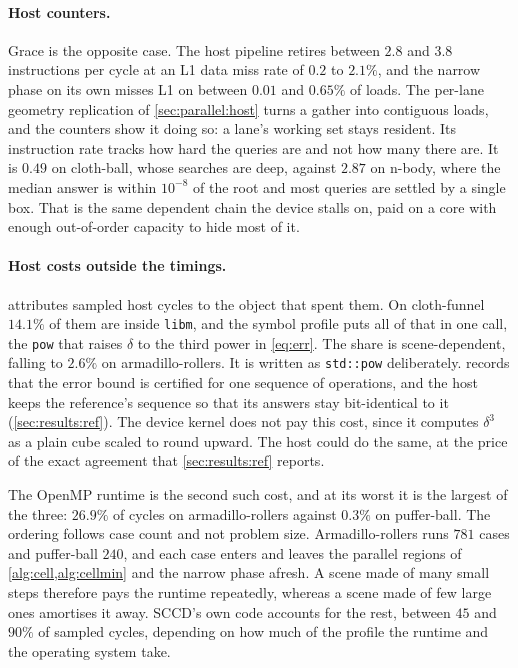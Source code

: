 \paragraph{Host counters.} Grace is the opposite case. The host pipeline retires
between $2.8$ and $3.8$ instructions per cycle at an L1 data miss rate of $0.2$
to $2.1\%$, and the narrow phase on its own misses L1 on between $0.01$ and
$0.65\%$ of loads. The per-lane geometry replication of \cref{sec:parallel:host}
turns a gather into contiguous loads, and the counters show it doing so: a
lane's working set stays resident. Its instruction rate tracks how hard the
queries are and not how many there are. It is $0.49$ on cloth-ball, whose
searches are deep, against $2.87$ on n-body, where the median answer is within
$10^{-8}$ of the root and most queries are settled by a single box. That is the
same dependent chain the device stalls on, paid on a core with enough
out-of-order capacity to hide most of it.

\paragraph{Host costs outside the timings.}  attributes
sampled host cycles to the object that spent them. On cloth-funnel $14.1\%$ of
them are inside \texttt{libm}, and the symbol profile puts all of that in one
call, the \texttt{pow} that raises $\delta$ to the third power in
\cref{eq:err}. The share is scene-dependent, falling to $2.6\%$ on
armadillo-rollers. It is written as \texttt{std::pow} deliberately.
 records that the error bound is certified for one sequence
of operations, and the host keeps the reference's sequence so that its answers
stay bit-identical to it (\cref{sec:results:ref}). The device kernel does not
pay this cost, since it computes $\delta^{3}$ as a plain cube scaled to round
upward. The host could do the same, at the price of the exact agreement that
\cref{sec:results:ref} reports.

The OpenMP runtime is the second such cost, and at its worst it is the largest
of the three: $26.9\%$ of cycles on armadillo-rollers against $0.3\%$ on
puffer-ball. The ordering follows case count and not problem size.
Armadillo-rollers runs $781$ cases and puffer-ball $240$, and each case enters
and leaves the parallel regions of \cref{alg:cell,alg:cellmin} and the narrow
phase afresh. A scene made of many small steps therefore pays the runtime
repeatedly, whereas a scene made of few large ones amortises it away. SCCD's own
code accounts for the rest, between $45$ and $90\%$ of sampled cycles, depending
on how much of the profile the runtime and the operating system take.

